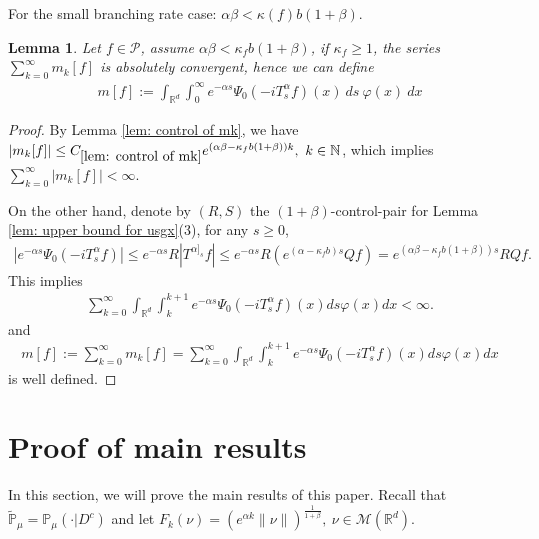 \documentclass[12pt,oneside,english]{amsart}
\theoremstyle{plain}
\newtheorem{lem}[thm]{Lemma}
\theoremstyle{definition}
\numberwithin{equation}{section}
\newcommand{\added}[1]{{\color{blue}#1}}\newcommand{\deleted}[1]{{\color{red}#1}}
\begin{document}
\deleted {For the small branching rate case: $\alpha\beta<\kappa(f)b(1+\beta)$.}
\begin{lem}\label{lemma211}
Let $f\in \mathcal{P}$, assume $\alpha\beta<\kappa_fb(1+\beta)$, if $\kappa_f\geq 1$, the series $\sum_{k=0}^{\infty}m_k[f]$ is absolutely convergent, hence we can define
\begin{align}
    m[f]:=\int_{\mathbb{R}^d}\int_0^{\infty} e^{-\alpha s}\Psi_0(-iT_{s}^{\alpha}f)(x)~ds~\varphi(x)~dx \label{msmallcase}
\end{align}
\end{lem}
\begin{proof}
\added{
    By Lemma \ref{lem: control of mk}, we have $|m_k[f]|\leq C_{\ref{lem: control of mk}} e^{(\alpha\beta-\kappa_fb(1+\beta))k},~k\in\mathbb{N}$, which implies $\sum_{k=0}^{\infty}|m_k[f]|<\infty$. 
    
    On the other hand, denote by $(R,S)$ the $(1+\beta)$-control-pair for Lemma \ref{lem: upper bound for usgx}(3), for any $s\geq 0$,
    \begin{align}
        |e^{-\alpha s}\Psi_0(-iT_{s}^{\alpha}f)|\leq e^{-\alpha s}R|T^{\alpha]_s}f|\leq e^{-\alpha s}R(e^{(\alpha-\kappa_fb)s}Qf)=e^{(\alpha\beta-\kappa_fb(1+\beta))s}RQf.
    \end{align}
    This implies 
    \begin{align}
        \sum_{k=0}^{\infty}\int_{\mathbb{R}^d}\int_k^{k+1} e^{-\alpha s}\Psi_0(-iT_{s}^{\alpha}f)(x)ds\varphi(x)dx< \infty.
    \end{align}
    and
    \begin{align}
            m[f]:=\sum_{k=0}^{\infty}m_k[f]=\sum_{k=0}^{\infty}\int_{\mathbb{R}^d}\int_k^{k+1} e^{-\alpha s}\Psi_0(-iT_{s}^{\alpha}f)(x)ds\varphi(x)dx
    \end{align}
    is well defined.
    }
\end{proof}

\section{Proof of main results}

In this section, we will prove the main results of this paper. Recall that $\mathbb{\tilde{P}}_{\mu}=\mathbb{P}_{\mu}(\cdot|D^c)$ and let $F_k(\nu)=\left(e^{\alpha k}\|\nu\|\right)^{\frac{1}{1+\beta}},~ \nu\in \mathcal{M}(\mathbb{R}^d)$.
\end{document}
